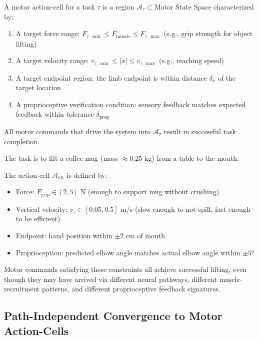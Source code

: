 \begin{definition}
\label{def:motor-action-cell}
A motor action-cell for a task $\tau$ is a region $\mathcal{A}_\tau \subset \text{Motor State Space}$ characterized by:
\begin{enumerate}[label=(\roman*), noitemsep]
\item A target force range: $F_{\tau,\min} \leq F_{\text{muscle}} \leq F_{\tau,\max}$ (e.g., grip strength for object lifting)
\item A target velocity range: $v_{\tau,\min} \leq |\dot{x}| \leq v_{\tau,\max}$ (e.g., reaching speed)
\item A target endpoint region: the limb endpoint is within distance $\delta_x$ of the target location
\item A proprioceptive verification condition: sensory feedback matches expected feedback within tolerance $\delta_{\text{prop}}$
\end{enumerate}

All motor commands that drive the system into $\mathcal{A}_\tau$ result in successful task completion.
\end{definition}

\begin{example}
\label{ex:mug-lift}
The task is to lift a coffee mug (mass $\approx 0.25$ kg) from a table to the mouth.

The action-cell $\mathcal{A}_{\text{lift}}$ is defined by:
\begin{itemize}[noitemsep]
\item Force: $F_{\text{grip}} \in [2, 5]$ N (enough to support mug without crushing)
\item Vertical velocity: $v_z \in [0.05, 0.5]$ m/s (slow enough to not spill, fast enough to be efficient)
\item Endpoint: hand position within $\pm 2$ cm of mouth
\item Proprioception: predicted elbow angle matches actual elbow angle within $\pm 5°$
\end{itemize}

Motor commands satisfying these constraints all achieve successful lifting, even though they may have arrived via different neural pathways, different muscle-recruitment patterns, and different proprioceptive feedback signatures.
\end{example}

\subsection{Path-Independent Convergence to Motor Action-Cells}
\label{subsec:convergence-motor}

